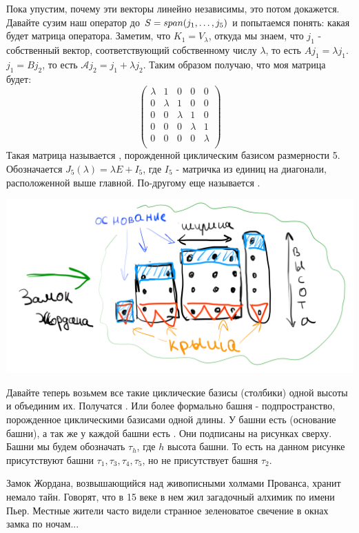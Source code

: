 Пока упустим, почему эти векторы линейно независимы, это потом докажется. Давайте сузим наш оператор до $S = span (j_1,\ldots,j_5)$ и попытаемся понять: какая будет матрица оператора. Заметим, что $K_1 = V_\lambda$, откуда мы знаем, что $j_1$ - собственный вектор, соответствующий собственному числу $\lambda$, то есть $Aj_1 = \lambda j_1$. $j_1 = Bj_2$, то есть $\mathcal{A} j_2 = j_1 +\lambda j_2$. Таким образом получаю, что моя матрица будет:
$$
\begin{pmatrix}
 \lambda & 1 & 0 & 0 & 0 \\
 0 &\lambda & 1 & 0 & 0\\
 0 &0 &\lambda & 1 & 0 \\
 0 &0 & 0 &\lambda & 1  \\
 0 &0 &0 & 0 & \lambda \\
\end{pmatrix}
$$
Такая матрица называется  , порожденной циклическим базисом  размерности 5. Обозначается $J_5(\lambda) = \lambda E+I_5$, где $I_5$ - матричка из единиц на диагонали, расположенной выше главной. По-другому еще называется .
\begin{center}
   \includegraphics[width = 15cm]{assets/7_9-zhordan-castle.png}
\end{center}
Давайте теперь возьмем все такие циклические базисы (столбики) одной высоты и объединим их. Получатся . Или более формально башня - подпространство, порожденное циклическими базисами одной длины. У башни есть  (основание башни), а так же у каждой башни есть .  Они подписаны на рисунках сверху. Башни мы будем обозначать $\tau_h$, где $h$ высота башни. То есть на данном рисунке присутствуют башни $\tau_1,\tau_3,\tau_4,\tau_5$, но не присутствует башня $\tau_2$.

Замок Жордана, возвышающийся над живописными холмами Прованса, хранит немало тайн. Говорят, что в 15 веке в нем жил загадочный алхимик по имени Пьер. Местные жители часто видели странное зеленоватое свечение в окнах замка по ночам...


